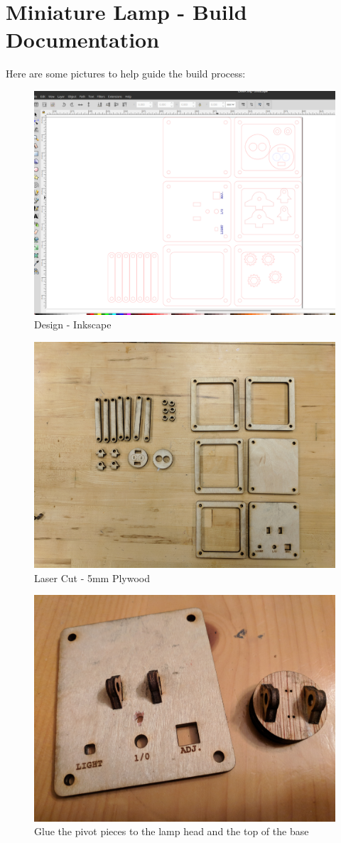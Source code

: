\documentclass[a4paper]{article}
\begin{document}
\section*{Miniature Lamp - Build Documentation}
Here are some pictures to help guide the build process:

\begin{figure}[h!]
\centerline{\includegraphics[width=.75\linewidth]{lampINK.png}}
\caption{Design - Inkscape}
\end{figure}

\begin{figure}[h!]
\centerline{\includegraphics[width=.75\linewidth]{lamp1.jpg}}
\caption{Laser Cut - 5mm Plywood}
\end{figure}

\begin{figure}[h!]
\centerline{\includegraphics[width=.75\linewidth]{lamp2.jpg}}
\caption{Glue the pivot pieces to the lamp head and the top of the base}
\end{figure}
\end{document}
